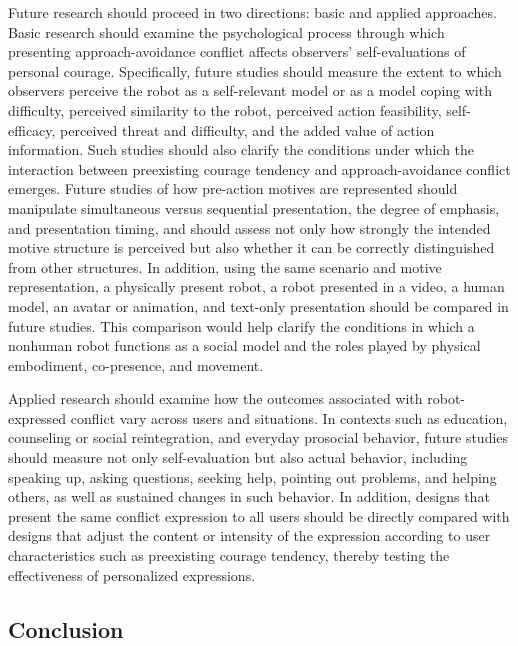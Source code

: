 \documentclass[
]{article}
\begin{document}
Future research should proceed in two directions: basic and applied
approaches. Basic research should examine the psychological process
through which presenting approach-avoidance conflict affects observers'
self-evaluations of personal courage. Specifically, future studies
should measure the extent to which observers perceive the robot as a
self-relevant model or as a model coping with difficulty, perceived
similarity to the robot, perceived action feasibility, self-efficacy,
perceived threat and difficulty, and the added value of action
information. Such studies should also clarify the conditions under which
the interaction between preexisting courage tendency and
approach-avoidance conflict emerges. Future studies of how pre-action
motives are represented should manipulate simultaneous versus sequential
presentation, the degree of emphasis, and presentation timing, and
should assess not only how strongly the intended motive structure is
perceived but also whether it can be correctly distinguished from other
structures. In addition, using the same scenario and motive
representation, a physically present robot, a robot presented in a
video, a human model, an avatar or animation, and text-only presentation
should be compared in future studies. This comparison would help clarify
the conditions in which a nonhuman robot functions as a social model and
the roles played by physical embodiment, co-presence, and movement.

Applied research should examine how the outcomes associated with
robot-expressed conflict vary across users and situations. In contexts
such as education, counseling or social reintegration, and everyday
prosocial behavior, future studies should measure not only
self-evaluation but also actual behavior, including speaking up, asking
questions, seeking help, pointing out problems, and helping others, as
well as sustained changes in such behavior. In addition, designs that
present the same conflict expression to all users should be directly
compared with designs that adjust the content or intensity of the
expression according to user characteristics such as preexisting courage
tendency, thereby testing the effectiveness of personalized expressions.

\subsection{Conclusion}\label{conclusion}
\end{document}
